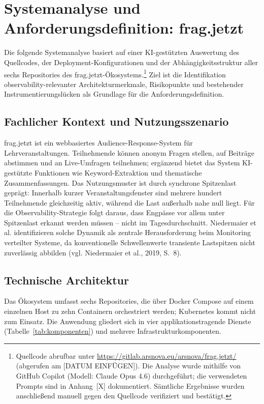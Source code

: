 
\chapter{Systemanalyse und Anforderungsdefinition: frag.jetzt}
 
Die folgende Systemanalyse basiert auf einer KI-gestützten Auswertung des Quellcodes, der Deployment-Konfigurationen und der Abhängigkeitsstruktur aller sechs Repositories des frag.jetzt-Ökosystems.\footnote{Quellcode abrufbar unter \url{https://gitlab.arsnova.eu/arsnova/frag.jetzt/} (abgerufen am [DATUM EINFÜGEN]). Die Analyse wurde mithilfe von GitHub Copilot (Modell: Claude Opus 4.6) durchgeführt; die verwendeten Prompts sind in Anhang~[X] dokumentiert. Sämtliche Ergebnisse wurden anschließend manuell gegen den Quellcode verifiziert und bestätigt.} Ziel ist die Identifikation observability-relevanter Architekturmerkmale, Risikopunkte und bestehender Instrumentierungslücken als Grundlage für die Anforderungsdefinition.
 
 
\section{Fachlicher Kontext und Nutzungsszenario}
 
frag.jetzt ist ein webbasiertes Audience-Response-System für Lehrveranstaltungen. Teilnehmende können anonym Fragen stellen, auf Beiträge abstimmen und an Live-Umfragen teilnehmen; ergänzend bietet das System KI-gestützte Funktionen wie Keyword-Extraktion und thematische Zusammenfassungen. Das Nutzungsmuster ist durch synchrone Spitzenlast geprägt: Innerhalb kurzer Veranstaltungsfenster sind mehrere hundert Teilnehmende gleichzeitig aktiv, während die Last außerhalb nahe null liegt. Für die Observability-Strategie folgt daraus, dass Engpässe vor allem unter Spitzenlast erkannt werden müssen -- nicht im Tagesdurchschnitt. Niedermaier et al. identifizieren solche Dynamik als zentrale Herausforderung beim Monitoring verteilter Systeme, da konventionelle Schwellenwerte transiente Lastspitzen nicht zuverlässig abbilden (vgl. Niedermaier et al., 2019, S.~8).
 
 
\section{Technische Architektur}

Das Ökosystem umfasst sechs Repositories, die über Docker Compose auf einem einzelnen Host zu zehn Containern orchestriert werden; Kubernetes kommt nicht zum Einsatz. Die Anwendung gliedert sich in vier applikationstragende Dienste (Tabelle~\ref{tab:komponenten}) und mehrere Infrastrukturkomponenten.

